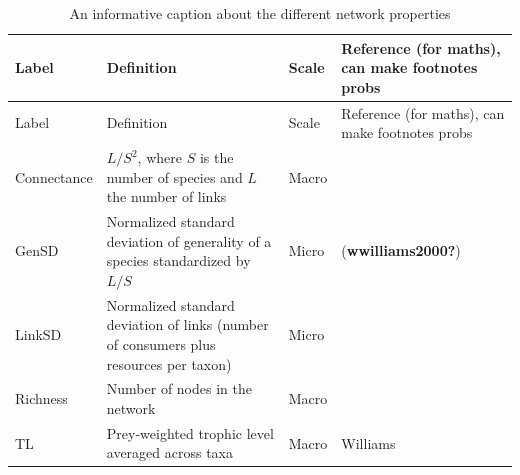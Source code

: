 \documentclass[
]{article}
\begin{document}
\begin{longtable}[]{@{}
  >{\raggedright\arraybackslash}p{}
  >{\raggedright\arraybackslash}p{}
  >{\raggedright\arraybackslash}p{}
  >{\raggedright\arraybackslash}p{}@{}}
\caption{An informative caption about the different network
properties}\label{tbl-properties}\tabularnewline
\toprule\noalign{}
\begin{minipage}[b]{\linewidth}\raggedright
Label
\end{minipage} & \begin{minipage}[b]{\linewidth}\raggedright
Definition
\end{minipage} & \begin{minipage}[b]{\linewidth}\raggedright
Scale
\end{minipage} & \begin{minipage}[b]{\linewidth}\raggedright
Reference (for maths), can make footnotes probs
\end{minipage} \\
\midrule\noalign{}
\endfirsthead
\toprule\noalign{}
\begin{minipage}[b]{\linewidth}\raggedright
Label
\end{minipage} & \begin{minipage}[b]{\linewidth}\raggedright
Definition
\end{minipage} & \begin{minipage}[b]{\linewidth}\raggedright
Scale
\end{minipage} & \begin{minipage}[b]{\linewidth}\raggedright
Reference (for maths), can make footnotes probs
\end{minipage} \\
\midrule\noalign{}
\endhead
\bottomrule\noalign{}
\endlastfoot
Connectance & \(L/S^2\), where \(S\) is the number of species and \(L\)
the number of links & Macro & \\
GenSD & Normalized standard deviation of generality of a species
standardized by \(L/S\) & Micro & (\textbf{wwilliams2000?}) \\
LinkSD & Normalized standard deviation of links (number of consumers
plus resources per taxon) & Micro & \\
Richness & Number of nodes in the network & Macro & \\
TL & Prey-weighted trophic level averaged across taxa & Macro & Williams

\end{longtable}
\end{document}
